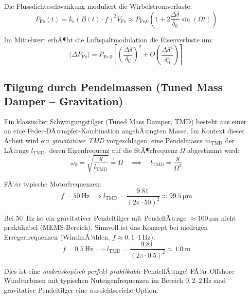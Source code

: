 ﻿\documentclass[12pt, a4paper]{report}
\theoremstyle{definition}
\theoremstyle{remark}
\begin{document}
Die Flussdichteschwankung moduliert die Wirbelstromverluste:
\begin{equation}
  P_{\text{Fe}}(t) = k_e (B(t)\cdot f)^2 V_{\text{Fe}}
  \approx P_{\text{Fe,0}}\left(1 + 2\frac{\Delta\delta}{\delta_0}\sin(\Omega t)\right)
  \label{eq:pfe_modulation}
\end{equation}

Im Mittelwert erhÃ¶ht die Luftspaltmodulation die Eisenverluste um:
\begin{equation}
  \langle \Delta P_{\text{Fe}} \rangle = P_{\text{Fe,0}}
  \left[\left(\frac{\Delta\delta}{\delta_0}\right)^2
  + O\!\left(\frac{\Delta\delta^4}{\delta_0^4}\right)\right]
  \label{eq:delta_pfe}
\end{equation}

\subsection{Tilgung durch Pendelmassen (Tuned Mass Damper -- Gravitation)}

Ein klassischer Schwingungstilger (Tuned Mass Damper, TMD) besteht aus einer
an eine Feder-DÃ¤mpfer-Kombination angehÃ¤ngten Masse. Im Kontext dieser Arbeit
wird ein \emph{gravitativer TMD} vorgeschlagen: eine Pendelmasse $m_\text{TMD}$
der LÃ¤nge $l_\text{TMD}$, deren Eigenfrequenz auf die StÃ¶rfrequenz $\Omega$
abgestimmt wird:
\begin{equation}
  \omega_0 = \sqrt{\frac{g}{l_\text{TMD}}} \stackrel{!}{=} \Omega
  \quad\implies\quad
  l_\text{TMD} = \frac{g}{\Omega^2}
  \label{eq:tmd_abstimmung}
\end{equation}

FÃ¼r typische Motorfrequenzen:
\begin{equation}
  f = \SI{50}{\hertz} \implies l_\text{TMD} = \frac{\SI{9.81}{}}{(2\pi\cdot50)^2}
  \approx \SI{99.5}{\micro\metre}
  \label{eq:tmd_50hz}
\end{equation}

Bei \SI{50}{\hertz} ist ein gravitativer Pendeltilger mit PendellÃ¤nge $\approx
\SI{100}{\micro\metre}$ nicht praktikabel (MEMS-Bereich). Sinnvoll ist das Konzept bei
niedrigen Erregerfrequenzen (WindmÃ¼hlen, $f \approx 0{,}1$--$1\,\si{\hertz}$):
\begin{equation}
  f = \SI{0.5}{\hertz} \implies l_\text{TMD} = \frac{\SI{9.81}{}}{(2\pi\cdot 0.5)^2}
  \approx \SI{1.0}{\metre}
  \label{eq:tmd_0p5hz}
\end{equation}

Dies ist eine \emph{makroskopisch perfekt praktikable} PendellÃ¤nge! FÃ¼r Offshore-
Windturbinen mit typischen Nuteigenfrequenzen im Bereich $0{,}2$--$2\,\si{\hertz}$
sind gravitative Pendeltilger eine aussichtsreiche Option.
\end{document}
